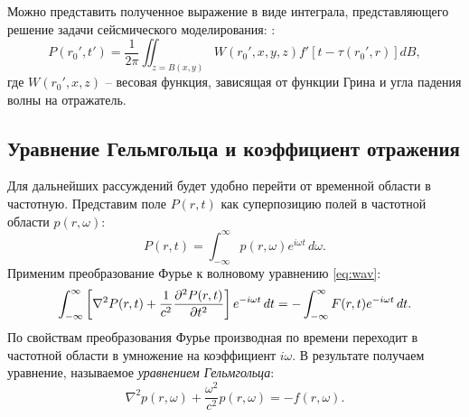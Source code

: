 \documentclass[a4paper, fontsize=14pt]{article}
\begin{document}
Можно представить полученное выражение в виде интеграла, представляющего решение задачи сейсмического моделирования: \cite{pokr}:
\begin{equation}
	P(r_0',t') = \frac{1}{2\pi} \iint_{z=B(x,y)} W(r_0',x,y,z) f'[t-\tau(r_0',r)] dB,
	\label{eq:modpokr}
\end{equation}
где $W(r_0',x,z)$ -- весовая функция, зависящая от функции Грина и угла падения волны на отражатель.
	\subsection{Уравнение Гельмгольца и коэффициент отражения}
	Для дальнейших рассуждений будет удобно перейти от временной области в частотную. Представим поле $P(r,t)$ как суперпозицию полей в частотной области $p(r,\omega)$:
	\begin{equation}
		P(r,t) =  \int_{-\infty}^{\infty} p(r,\omega) e^{i\omega t}\, d\omega.
	\end{equation}
	Применим преобразование Фурье к волновому уравнению \eqref{eq:wav}:
	\begin{equation}
		\int_{-\infty}^{\infty} \left[ \nabla^2 P(r,t) + \frac{1}{c^2}\diff[2]{P(r,t)}{t}\right] e^{-i\omega t} \, dt = - \int_{-\infty}^{\infty}   F(r,t) e^{-i\omega t} \, dt.
	\end{equation}
	По свойствам преобразования Фурье производная по времени переходит в частотной области в умножение на коэффициент 
	$i\omega$. В результате получаем уравнение, называемое {\it уравнением Гельмгольца}:
	\begin{equation}
		\nabla^2 p(r,\omega) + \frac{\omega^2}{c^2}p(r,\omega) = - f(r,\omega).
		\label{eq:helmholtz}
	\end{equation}

\end{document}
